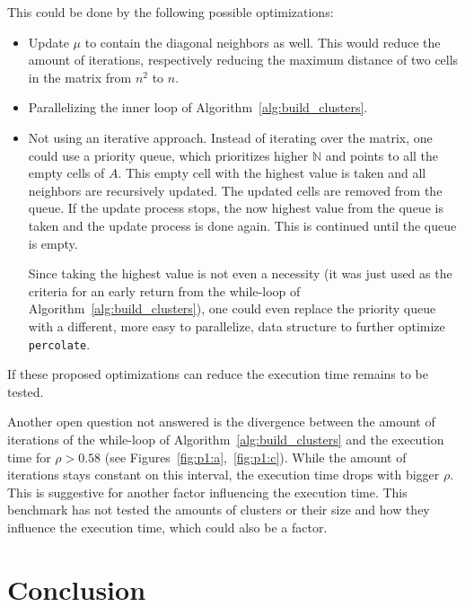 \documentclass[twoside,11pt]{article}
\def\perc{\texttt{perco\-late}}
\begin{document}
This could be done by the following possible optimizations:
\begin{itemize}
  \item Update $\mu$ to contain the diagonal neighbors as
        well. This would reduce the amount of iterations,
        respectively reducing the maximum distance of two
        cells in the matrix from $n^2$ to $n$.

  \item Parallelizing the inner loop of
        Algorithm~\ref{alg:build_clusters}.

  \item Not using an iterative approach. Instead of
        iterating over the matrix, one could use a priority
        queue, which prioritizes higher $\mathbb{N}$
        and points to all the empty cells of $A$.
        This empty cell with the highest value is taken and
        all neighbors are recursively updated.
        The updated cells are removed from the queue.
        If the update process stops, the now highest value
        from the queue is taken and the update
        process is done again.
        This is continued until the queue is empty.

        Since taking the highest value is not even a
        necessity (it was just used as the criteria for
        an early return from the while-loop of
        Algorithm~\ref{alg:build_clusters}), one could
        even replace the priority queue with a different,
        more easy to parallelize, data structure to further
        optimize \perc.

\end{itemize}
If these proposed optimizations can reduce the execution
time remains to be tested.

Another open question not answered is the divergence
between the amount of iterations of the while-loop of
Algorithm~\ref{alg:build_clusters} and the execution time
for $\rho > 0.58$
(see Figures~\ref{fig:p1:a},~\ref{fig:p1:c}).
While the amount of iterations stays constant on this
interval, the execution time drops with bigger $\rho$.
This is suggestive for another factor influencing the
execution time.
This benchmark has not tested the amounts of clusters or
their size and how they influence the execution time,
which could also be a factor.


\section{Conclusion} %
\end{document}
